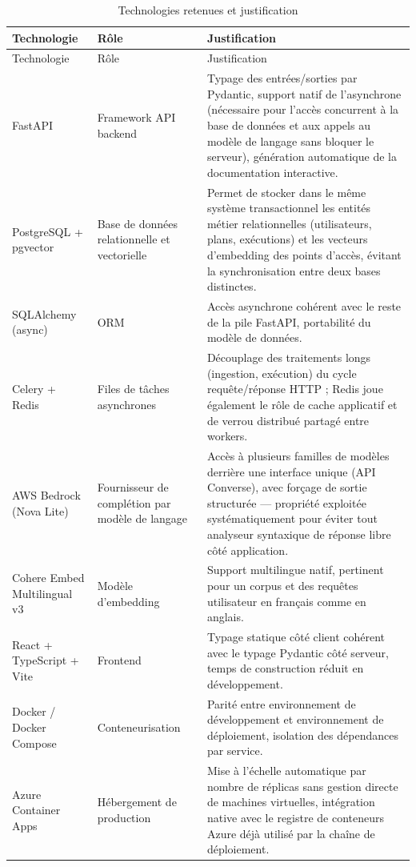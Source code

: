 \begin{longtable}{L{3cm}L{3.5cm}Y}
  \caption{Technologies retenues et justification} \label{tab:techno-role} \\
  Technologie & Rôle & Justification \\
  \hline
  \endfirsthead
  Technologie & Rôle & Justification \\
  \hline
  \endhead
  FastAPI & Framework API backend & Typage des entrées/sorties par Pydantic, support natif de l'asynchrone (nécessaire pour l'accès concurrent à la base de données et aux appels au modèle de langage sans bloquer le serveur), génération automatique de la documentation interactive. \\ \hline
  PostgreSQL + pgvector & Base de données relationnelle et vectorielle & Permet de stocker dans le même système transactionnel les entités métier relationnelles (utilisateurs, plans, exécutions) et les vecteurs d'embedding des points d'accès, évitant la synchronisation entre deux bases distinctes. \\ \hline
  SQLAlchemy (async) & ORM & Accès asynchrone cohérent avec le reste de la pile FastAPI, portabilité du modèle de données. \\ \hline
  Celery + Redis & Files de tâches asynchrones & Découplage des traitements longs (ingestion, exécution) du cycle requête/réponse HTTP ; Redis joue également le rôle de cache applicatif et de verrou distribué partagé entre workers. \\ \hline
  AWS Bedrock (Nova Lite) & Fournisseur de complétion par modèle de langage & Accès à plusieurs familles de modèles derrière une interface unique (API Converse), avec forçage de sortie structurée — propriété exploitée systématiquement pour éviter tout analyseur syntaxique de réponse libre côté application. \\ \hline
  Cohere Embed Multilingual v3 & Modèle d'embedding & Support multilingue natif, pertinent pour un corpus et des requêtes utilisateur en français comme en anglais. \\ \hline
  React + TypeScript + Vite & Frontend & Typage statique côté client cohérent avec le typage Pydantic côté serveur, temps de construction réduit en développement. \\ \hline
  Docker / Docker Compose & Conteneurisation & Parité entre environnement de développement et environnement de déploiement, isolation des dépendances par service. \\ \hline
  Azure Container Apps & Hébergement de production & Mise à l'échelle automatique par nombre de réplicas sans gestion directe de machines virtuelles, intégration native avec le registre de conteneurs Azure déjà utilisé par la chaîne de déploiement. \\ \hline
\end{longtable}

